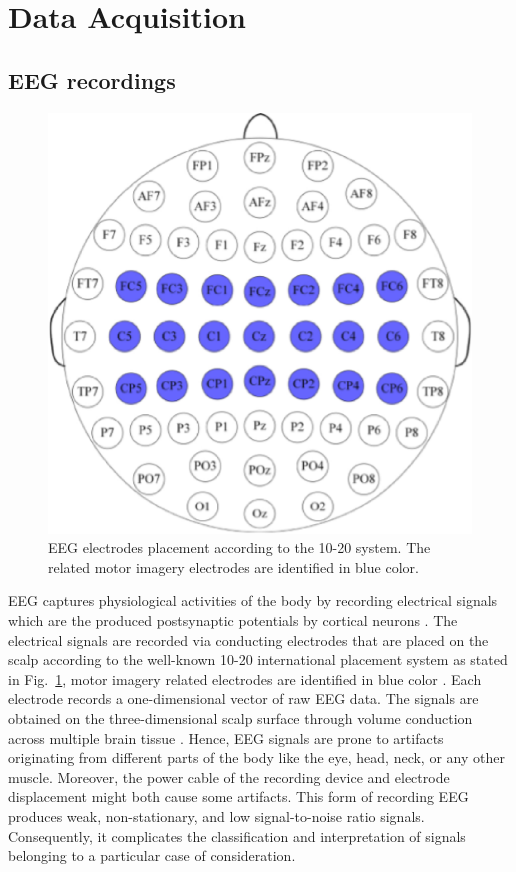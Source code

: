 \documentclass[journal,twocolumn]{IEEEtran}
\begin{document}
\section{Data Acquisition}

\subsection{EEG recordings}

\begin{figure}[htbp]  %
  \centering  %
  \includegraphics[width=\linewidth]{figures/fig2.eps}  %
  \caption{EEG electrodes placement according to the 10-20 system. The related motor imagery electrodes are identified in blue color.}  %
  \label{fig:10-20}  %
\end{figure}

EEG captures physiological activities of the body by recording electrical signals which are the produced postsynaptic potentials by cortical neurons \cite{sazgar2019overview}. The electrical signals are recorded via conducting electrodes that are placed on the scalp according to the well-known 10-20 international placement system as stated in Fig.~\ref{fig:10-20}, motor imagery related electrodes are identified in blue color \cite{Kwon2020}. Each electrode records a one-dimensional vector of raw EEG data. The signals are obtained on the three-dimensional scalp surface through volume conduction across multiple brain tissue \cite{sazgar2019overview}. Hence, EEG signals are prone to artifacts originating from different parts of the body like the eye, head, neck, or any other muscle. Moreover, the power cable of the recording device and electrode displacement might both cause some artifacts. This form of recording EEG produces weak, non-stationary, and low signal-to-noise ratio signals. Consequently, it complicates the classification and interpretation of signals belonging to a particular case of consideration.
\end{document}
